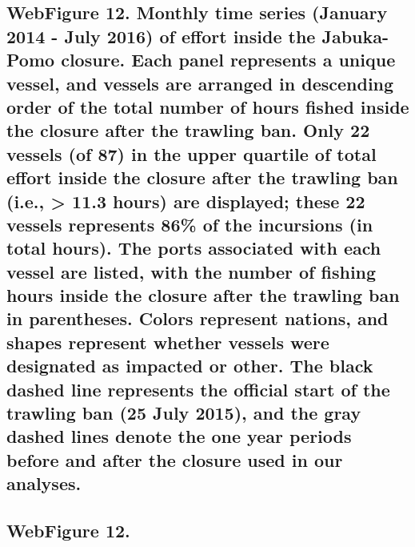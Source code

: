 \documentclass[11pt,]{article}
\begin{document}
\subsection{WebFigure 12. Monthly time series (January 2014 - July 2016)
of effort inside the Jabuka-Pomo closure. Each panel represents a unique
vessel, and vessels are arranged in descending order of the total number
of hours fished inside the closure after the trawling ban. Only 22
vessels (of 87) in the upper quartile of total effort inside the closure
after the trawling ban (i.e., \textgreater{} 11.3 hours) are displayed;
these 22 vessels represents 86\% of the incursions (in total hours). The
ports associated with each vessel are listed, with the number of fishing
hours inside the closure after the trawling ban in parentheses. Colors
represent nations, and shapes represent whether vessels were designated
as impacted or other. The black dashed line represents the official
start of the trawling ban (25 July 2015), and the gray dashed lines
denote the one year periods before and after the closure used in our
analyses.}\label{webfigure-12.-monthly-time-series-january-2014---july-2016-of-effort-inside-the-jabuka-pomo-closure.-each-panel-represents-a-unique-vessel-and-vessels-are-arranged-in-descending-order-of-the-total-number-of-hours-fished-inside-the-closure-after-the-trawling-ban.-only-22-vessels-of-87-in-the-upper-quartile-of-total-effort-inside-the-closure-after-the-trawling-ban-i.e.-11.3-hours-are-displayed-these-22-vessels-represents-86-of-the-incursions-in-total-hours.-the-ports-associated-with-each-vessel-are-listed-with-the-number-of-fishing-hours-inside-the-closure-after-the-trawling-ban-in-parentheses.-colors-represent-nations-and-shapes-represent-whether-vessels-were-designated-as-impacted-or-other.-the-black-dashed-line-represents-the-official-start-of-the-trawling-ban-25-july-2015-and-the-gray-dashed-lines-denote-the-one-year-periods-before-and-after-the-closure-used-in-our-analyses.}

\newpage

\subsection{WebFigure 12.}\label{webfigure-12.}
\end{document}
